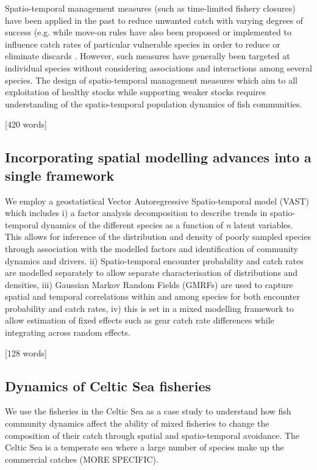 \documentclass{nature}
\begin{document}
\begin{linenumbers}
Spatio-temporal management measures (such as time-limited fishery closures)
have been applied in the past to reduce unwanted catch with varying degrees of
success (e.g. \cite{Needle2011, Holmes2011, Beare2010, Dinmore2003} while
move-on rules have also been proposed or implemented to influence catch rates
of particular vulnerable species in order to reduce or eliminate discards
\cite{Gardner2008, Dunn2011, Dunn2014a}. However, such measures have generally
been targeted at individual species without considering associations and
interactions among several species. The design of spatio-temporal management
measures which aim to all exploitation of healthy stocks while supporting
weaker stocks requires understanding of the spatio-temporal population dynamics
of fish communities. 

[420 words]

\subsection{Incorporating spatial modelling advances into a single framework}

We employ a geostatistical Vector Autoregressive Spatio-temporal model (VAST)
which includes i) a factor analysis decomposition to describe trends in
spatio-temporal dynamics of the different species as a function of \textit{n}
latent variables. This allows for inference of the distribution and density of
poorly sampled species through association with the modelled factors and
identification of community dynamics and drivers. ii) Spatio-temporal encounter
probability and catch rates are modelled separately to allow separate
characterisation of distributions and densities, iii) Gaussian Markov Random
Fields (GMRFs) are used to capture spatial and temporal correlations within and
among species for both encounter probability and catch rates, iv) this is set
in a mixed modelling framework to allow estimation of fixed effects such as
gear catch rate differences while integrating across random effects.

[128 words]

\subsection{Dynamics of Celtic Sea fisheries}

We use the fisheries in the Celtic Sea as a case study to understand how fish
community dynamics affect the ability of mixed fisheries to change the
composition of their catch through spatial and spatio-temporal avoidance. The
Celtic Sea is a temperate sea where a large number of species make up the
commercial catches (MORE SPECIFIC).


\end{linenumbers}
\end{document}
